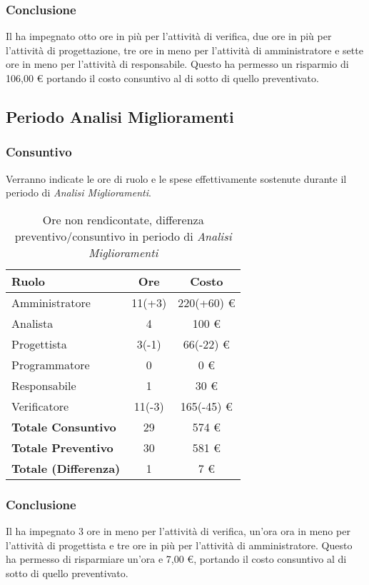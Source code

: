 \subsubsection{Conclusione}
Il  ha impegnato otto ore in pi\`u per l'attivit\`a di verifica, due ore in pi\`u per l'attivit\`a di progettazione, tre ore in meno per l'attivit\`a di amministratore e sette ore in meno per l'attivit\`a di responsabile. Questo ha permesso un risparmio di 106,00 \euro{} portando il costo consuntivo al di sotto di quello preventivato.

\newpage


\subsection{Periodo Analisi Miglioramenti}
\subsubsection{Consuntivo}
Verranno indicate le ore di ruolo e le spese effettivamente sostenute durante il periodo di \textit{Analisi Miglioramenti}.

\begin{table}[H]
	\centering
	\begin{tabular}{ l c c }
		\textbf{Ruolo} & \textbf{Ore} & \textbf{Costo} \\
		\hline
		Amministratore & 11(+3) & 220(+60) \euro{} \\
		Analista & 4 & 100 \euro{} \\
		Progettista & 3(-1) & 66(-22) \euro{} \\
		Programmatore & 0 & 0 \euro{} \\
		Responsabile & 1 & 30 \euro{} \\
		Verificatore & 11(-3) & 165(-45) \euro{} \\
		\hline
		\textbf{Totale Consuntivo} & 29 & 574 \euro{} \\
		\hline
		\textbf{Totale Preventivo} & 30 & 581 \euro{} \\
		\hline
		\textbf{Totale (Differenza)} & 1 & 7 \euro{} \\
		\hline
	\end{tabular}
	\caption{Ore non rendicontate, differenza preventivo/consuntivo in periodo di \textit{Analisi Miglioramenti}}
\end{table}



\subsubsection{Conclusione}
Il  ha impegnato 3 ore in meno per l'attivit\`a di verifica, un'ora ora in meno per l'attivit\`a di progettista e tre ore in più per l'attivit\`a di amministratore. Questo ha permesso di risparmiare un'ora e 7,00 \euro{}, portando il costo consuntivo al di sotto di quello preventivato.
